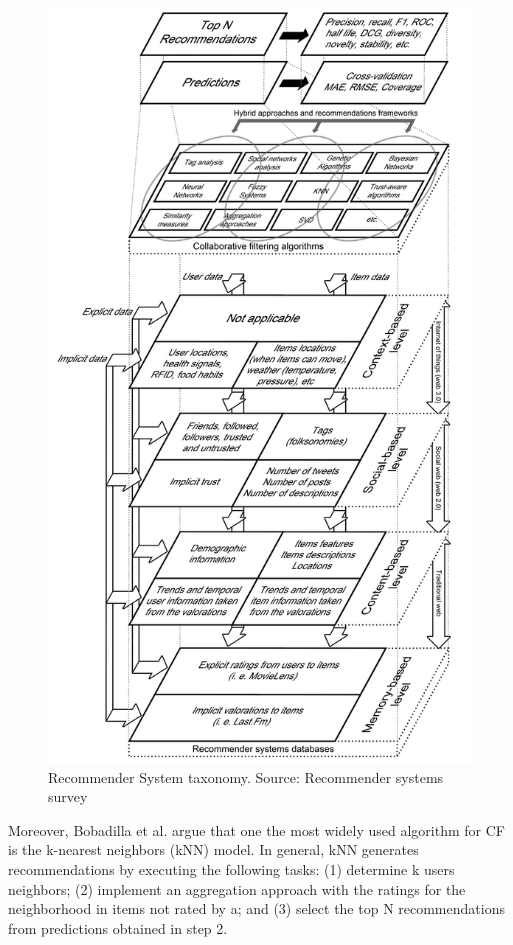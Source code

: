 \begin{figure}[h]
\centering
\includegraphics[scale=0.8]{images/taxonomyrs}
\caption[Recommender Systems taxonomy]{Recommender System taxonomy. Source: Recommender systems survey\cite{bobadilla2013recommender}}
\label{fig:taxonomy}
\end{figure}

Moreover, Bobadilla et al. argue that one the most widely used algorithm for CF is the k-nearest neighbors (kNN) model. In general, kNN generates recommendations by executing the following tasks: (1) determine k users neighbors; (2) implement an aggregation approach with the ratings for the neighborhood in items not rated by a; and (3) select the top N recommendations from predictions obtained in step 2.

